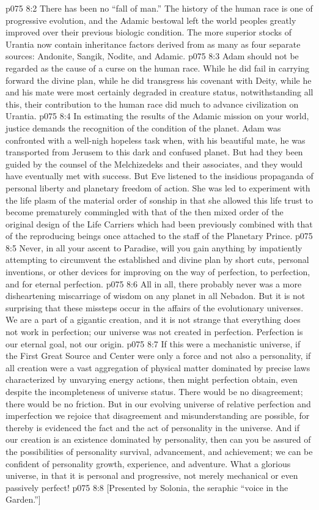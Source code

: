 \vs p075 8:2 There has been no “fall of man.” The history of the human race is one of progressive evolution, and the Adamic bestowal left the world peoples greatly improved over their previous biologic condition. The more superior stocks of Urantia now contain inheritance factors derived from as many as four separate sources: Andonite, Sangik, Nodite, and Adamic.
\vs p075 8:3 Adam should not be regarded as the cause of a curse on the human race. While he did fail in carrying forward the divine plan, while he did transgress his covenant with Deity, while he and his mate were most certainly degraded in creature status, notwithstanding all this, their contribution to the human race did much to advance civilization on Urantia.
\pc \vs p075 8:4 In estimating the results of the Adamic mission on your world, justice demands the recognition of the condition of the planet. Adam was confronted with a well\hyp{}nigh hopeless task when, with his beautiful mate, he was transported from Jerusem to this dark and confused planet. But had they been guided by the counsel of the Melchizedeks and their associates, and  they would have eventually met with success. But Eve listened to the insidious propaganda of personal liberty and planetary freedom of action. She was led to experiment with the life plasm of the material order of sonship in that she allowed this life trust to become prematurely commingled with that of the then mixed order of the original design of the Life Carriers which had been previously combined with that of the reproducing beings once attached to the staff of the Planetary Prince.
\vs p075 8:5 Never, in all your ascent to Paradise, will you gain anything by impatiently attempting to circumvent the established and divine plan by short cuts, personal inventions, or other devices for improving on the way of perfection, to perfection, and for eternal perfection.
\pc \vs p075 8:6 All in all, there probably never was a more disheartening miscarriage of wisdom on any planet in all Nebadon. But it is not surprising that these missteps occur in the affairs of the evolutionary universes. We are a part of a gigantic creation, and it is not strange that everything does not work in perfection; our universe was not created in perfection. Perfection is our eternal goal, not our origin.
\vs p075 8:7 If this were a mechanistic universe, if the First Great Source and Center were only a force and not also a personality, if all creation were a vast aggregation of physical matter dominated by precise laws characterized by unvarying energy actions, then might perfection obtain, even despite the incompleteness of universe status. There would be no disagreement; there would be no friction. But in our evolving universe of relative perfection and imperfection we rejoice that disagreement and misunderstanding are possible, for thereby is evidenced the fact and the act of personality in the universe. And if our creation is an existence dominated by personality, then can you be assured of the possibilities of personality survival, advancement, and achievement; we can be confident of personality growth, experience, and adventure. What a glorious universe, in that it is personal and progressive, not merely mechanical or even passively perfect!\plusone
\vsetoff
\vs p075 8:8 [Presented by Solonia, the seraphic “voice in the Garden.”]
